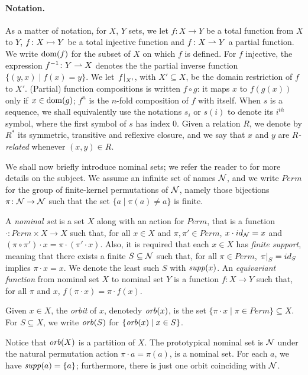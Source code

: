 \paragraph{Notation.} As a matter of notation, for $X$, $Y$ sets, we let $f \colon X \to Y$ be a total function from $X$ to $Y$, $f \colon X \rightarrowtail Y$ be a total injective function and $f \colon X \rightharpoonup Y$ a partial function. We write $\operatorname{dom}(f)$ for the subset of $X$ on which $f$ is defined. For $f$ injective, the expression $f^{-1} \colon Y \rightharpoonup X$ denotes the the partial inverse function $\{(y,x) \mid f(x) = y \}$. We let $\left.f\right|_{X'}$, with $X' \subseteq X$, be the domain restriction of $f$ to $X'$. (Partial) function compositions is written $f \circ g$: it maps $x$ to $f(g(x))$ only if $x \in \operatorname{dom}(g)$; $f^n$ is the $n$-fold composition of $f$ with itself. When $s$ is a sequence, we shall equivalently use the notations $s_i$ or $s(i)$ to denote its $i^{\mathit{th}}$ symbol, where the first symbol of $s$ has index $0$. Given a relation $R$, we denote by $R^*$ its symmetric, transitive and reflexive closure, and we say that $x$ and $y$ are \emph{$R$-related} whenever $(x,y) \in R$.

We shall now briefly introduce nominal sets; we refer the reader to \cite{GabbayPitts?} for more details on the subject. We assume an infinite set of names $\mathcal{N}$, and we write $Perm$ for the group of finite-kernel permutations of $\mathcal{N}$, namely those bijections $\pi \colon \mathcal{N} \to \mathcal{N}$ such that the set $\{ a \mid \pi(a) \neq a \}$ is finite.
\begin{definition}
A \emph{nominal set} is a set $X$ along with an action for $Perm$, that is a function $\cdot \colon Perm \times X \to X$ such that, for all $x \in X$ and $\pi,\pi' \in Perm$, $x \cdot id_{\mathcal{N}} = x$ and $(\pi \circ \pi') \cdot x = \pi \cdot (\pi' \cdot x)$. Also, it is required that each $x \in X$ has \emph{finite support}, meaning that there exists a finite $S \subseteq \mathcal{N}$ such that, for all $\pi \in Perm$, $\left.\pi\right|_{S} = id_S$ implies $\pi \cdot x = x$. We denote the least such $S$ with $\mathit{supp}(x)$. An \emph{equivariant function} from nominal set $X$ to nominal set $Y$ is a function $f : X \to Y$ such that, for all $\pi$ and $x$, $f(\pi \cdot x) = \pi \cdot f(x)$.
\end{definition}
%
\begin{definition}
Given $x \in X$, the \emph{orbit} of $x$, denotedy $\mathit{orb}(x) $, is the set $\{ \pi \cdot x \mid \pi \in Perm\} \subseteq X$. For $S \subseteq X$, we write $\mathit{orb}(S)$ for $\{ \mathit{orb}(x) \mid x \in S\}$. 
\end{definition}

Notice that $\mathit{orb}(X)$ is a partition of $X$. The prototypical nominal set is $\mathcal{N}$ under the natural permutation action $\pi \cdot a = \pi(a)$, is a nominal set. For each $a$, we have $\mathit{supp}(a) = \{a\}$; furthermore, there is just one orbit coinciding with $\mathcal{N}$.
